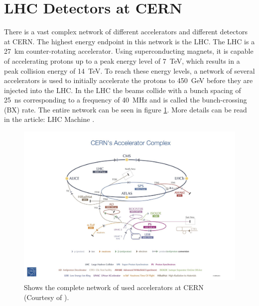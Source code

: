 \section{LHC Detectors at CERN}
\label{detectors}
There is a vast complex network of different accelerators and different detectors at CERN. The highest energy endpoint in this network is the LHC. The LHC is a \SI{27}{km} counter-rotating accelerator. Using superconducting magnets, it is capable of accelerating protons up to a peak energy level of \SI{7}{TeV}, which results in a peak collision energy of \SI{14}{TeV}. To reach these energy levels, a network of several accelerators is used to initially accelerate the protons to \SI{450}{GeV} before they are injected into the LHC. In the LHC the beams collide with a bunch spacing of \SI{25}{ns} corresponding to a frequency of \SI{40}{MHz} and is called the bunch-crossing (BX) rate. The entire network can be seen in figure \ref{fig:accelerator_network_cern}. More details can be read in the article: LHC Machine \cite{LHCmachine}.

\begin{figure}[H]
    \centering
    \includegraphics[width=\linewidth]{subfiles/imgs/acceleratorNetworkCERN.pdf}
    \caption{Shows the complete network of used accelerators at CERN (Courtesy of \cite{Haffner:1621894}).}
    \label{fig:accelerator_network_cern}
\end{figure}

